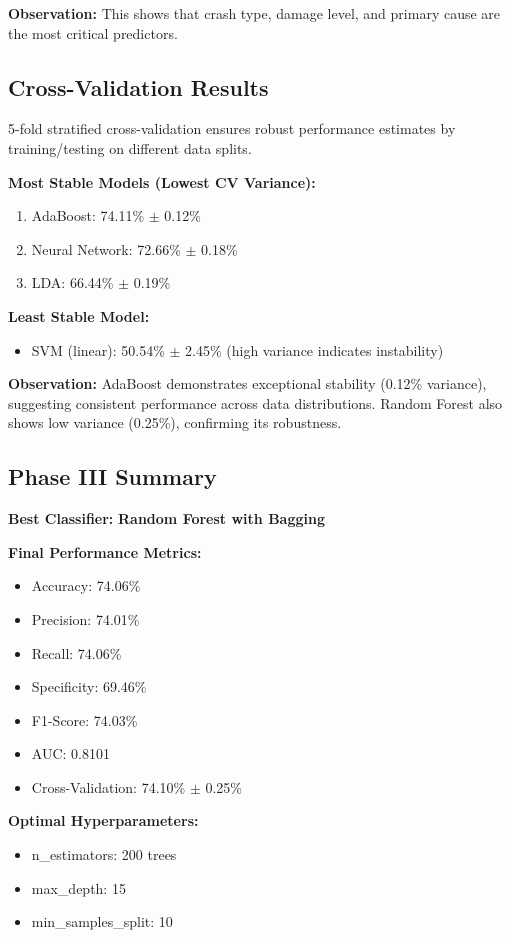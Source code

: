\documentclass[stu,12pt,floatsintext]{apa7}
\begin{document}
\textbf{Observation:} This shows that crash type, damage level, and primary cause are the most critical predictors.

\subsection{Cross-Validation Results}

5-fold stratified cross-validation ensures robust performance estimates by training/testing on different data splits.

\textbf{Most Stable Models (Lowest CV Variance):}
\begin{enumerate}
    \item AdaBoost: 74.11\% $\pm$ 0.12\%
    \item Neural Network: 72.66\% $\pm$ 0.18\%
    \item LDA: 66.44\% $\pm$ 0.19\%
\end{enumerate}

\textbf{Least Stable Model:}
\begin{itemize}
    \item SVM (linear): 50.54\% $\pm$ 2.45\% (high variance indicates instability)
\end{itemize}

\textbf{Observation:} AdaBoost demonstrates exceptional stability (0.12\% variance), suggesting consistent performance across data distributions. Random Forest also shows low variance (0.25\%), confirming its robustness.

\subsection{Phase III Summary}

\textbf{Best Classifier:} \textbf{Random Forest with Bagging}

\textbf{Final Performance Metrics:}
\begin{itemize}
    \item Accuracy: 74.06\%
    \item Precision: 74.01\%
    \item Recall: 74.06\%
    \item Specificity: 69.46\%
    \item F1-Score: 74.03\%
    \item AUC: 0.8101
    \item Cross-Validation: 74.10\% $\pm$ 0.25\%
\end{itemize}

\textbf{Optimal Hyperparameters:}
\begin{itemize}
    \item n\_estimators: 200 trees
    \item max\_depth: 15
    \item min\_samples\_split: 10
\end{itemize}
\end{document}
